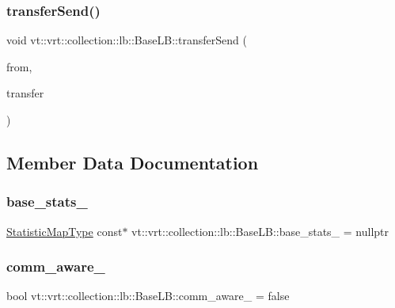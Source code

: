 \subsubsection{\texorpdfstring{transfer\+Send()}{transferSend()}}
{\footnotesize\ttfamily void vt\+::vrt\+::collection\+::lb\+::\+Base\+L\+B\+::transfer\+Send (\begin{DoxyParamCaption}\item[{\hyperlink{namespacevt_a866da9d0efc19c0a1ce79e9e492f47e2}{Node\+Type}}]{from,  }\item[{\hyperlink{structvt_1_1vrt_1_1collection_1_1lb_1_1_base_l_b_a329e8179ec41a1bd4924c79fe23a79af}{Transfer\+Vec\+Type} const \&}]{transfer }\end{DoxyParamCaption})}



\subsection{Member Data Documentation}
\mbox{\label{structvt_1_1vrt_1_1collection_1_1lb_1_1_base_l_b_aae83b83b87e2dea3d44861bd3fb1fde8}} 
\subsubsection{\texorpdfstring{base\+\_\+stats\+\_\+}{base\_stats\_}}
{\footnotesize\ttfamily \hyperlink{structvt_1_1vrt_1_1collection_1_1lb_1_1_base_l_b_acd9bdad961ac83c96b7a227de672f96c}{Statistic\+Map\+Type} const$\ast$ vt\+::vrt\+::collection\+::lb\+::\+Base\+L\+B\+::base\+\_\+stats\+\_\+ = nullptr\hspace{0.3cm}{\ttfamily [private]}}

\mbox{\label{structvt_1_1vrt_1_1collection_1_1lb_1_1_base_l_b_a0b7eb81cc499a7cd7c1a6fd1f6a3c8fe}} 
\subsubsection{\texorpdfstring{comm\+\_\+aware\+\_\+}{comm\_aware\_}}
{\footnotesize\ttfamily bool vt\+::vrt\+::collection\+::lb\+::\+Base\+L\+B\+::comm\+\_\+aware\+\_\+ = false\hspace{0.3cm}{\ttfamily [protected]}}

